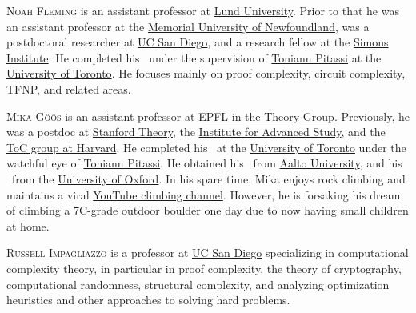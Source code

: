 \documentclass{toc}
\begin{document}
\begin{tocaboutauthors}
\begin{tocabout}[fleming]
\textsc{Noah Fleming} is an assistant professor at
\href{https://www.lunduniversity.lu.se/}{Lund University}. Prior to
that  %
he was an assistant professor at 
the   %
\href{https://www.mun.ca/}{Memorial University of Newfoundland},
was a postdoctoral researcher at
\href{https://ucsd.edu/}{UC San Diego}, and a research fellow at the
\href{https://simons.berkeley.edu/homepage}{Simons Institute}. He
completed his \phd\ under the supervision of
\href{https://www.cs.columbia.edu/~toni/}{Toniann Pitassi} at the
\href{https://www.utoronto.ca/}{University of Toronto}. He focuses
mainly on proof complexity, circuit complexity, TFNP, and related areas.
\end{tocabout}

\begin{tocabout}[goos]
\textsc{Mika G\"o\"os} is an assistant professor at 
\href{https://theory.epfl.ch/}{EPFL in the  Theory Group}. 
Previously, he was a postdoc at
\href{http://theory.stanford.edu/}{Stanford Theory}, the
\href{https://www.ias.edu/}{Institute for Advanced Study}, and the 
\href{http://toc.seas.harvard.edu/}{ToC group at Harvard}. He completed his \phd\ at the
\href{http://www.cs.toronto.edu}{University of Toronto} under the watchful eye of 
\href{http://www.cs.toronto.edu/~toni/}{Toniann Pitassi}. He obtained his \bsc\ from 
\href{https://www.aalto.fi/}{Aalto University}, and his \msc\ from the 
\href{https://www.cs.ox.ac.uk/}{University of Oxford}. In his spare time, 
Mika enjoys rock climbing and maintains a viral 
\href{https://www.youtube.com/@mikagoos2706/}{YouTube climbing channel}.
However, he is forsaking his dream of climbing %
a  %
7C-grade outdoor boulder one day due to now having small children at home.
%
%
%
\end{tocabout}

\begin{tocabout}[impagliazzo]
\textsc{Russell Impagliazzo} is a professor at
\href{https://ucsd.edu/}{UC San Diego} specializing in computational
complexity theory, in particular in proof complexity, the theory of
cryptography, computational randomness, structural complexity, and
analyzing optimization heuristics and other approaches to solving hard
problems.
\end{tocabout}


\end{tocaboutauthors}
\end{document}
